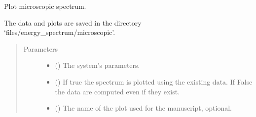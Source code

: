 \documentclass[letterpaper,10pt,english]{sphinxmanual}
\begin{document}
\begin{fulllineitems}
\label{\detokenize{modules:modules.utils.plot_spectrum_micro}}
\pysigstartsignatures
{}
\pysigstopsignatures
\sphinxAtStartPar
Plot microscopic spectrum.

\sphinxAtStartPar
The data and plots are saved in the directory ‘files/energy\_spectrum/microscopic’.
\begin{quote}\begin{description}
\item[{Parameters}] \leavevmode\begin{itemize}
\item {} 
\sphinxAtStartPar
{} () \textendash{} The system’s parameters.

\item {} 
\sphinxAtStartPar
{} () \textendash{} If true the spectrum is plotted using the existing data.
If False the data are computed even if they exist.

\item {} 
\sphinxAtStartPar
{} () \textendash{} The name of the plot used for the manuscript, optional.

\end{itemize}

\end{description}\end{quote}

\end{fulllineitems}

\end{document}
